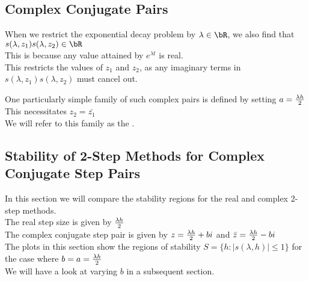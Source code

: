 \subsection{Complex Conjugate Pairs}
\begin{multicols}{2}
\columnbreak{}
\par When we restrict the exponential decay problem by $\lambda \in \bR$, we also find that $s(\lambda, z_1) s(\lambda, z_2) \in \bR$\\
This is because any value attained by $e^{\lambda t}$ is real.\\
This restricts the values of $z_1$ and $z_2$, as any imaginary terms in $s(\lambda, z_1) s(\lambda, z_2)$ must cancel out.\\

\par One particularly simple family of such complex pairs is defined by setting $a = \frac{\lambda h}{2}$\\
This necessitates $z_2 = \bar{z_1}$\\
We will refer to this family as the .\\
\end{multicols}

\subsection{Stability of 2-Step Methods for Complex Conjugate Step Pairs}
\par In this section we will compare the stability regions for the real and complex 2-step methods.\\
The real step size is given by $\frac{\lambda h}{2}$\\
The complex conjugate step pair is given by $z = \frac{\lambda h}{2} + bi$ and $\bar{z} = \frac{\lambda h}{2} - bi$\\
The plots in this section show the regions of stability $S = \{h : |s(\lambda, h)| \leq 1\}$ for the case where $b=a=\frac{\lambda h}{2}$\\
We will have a look at varying $b$ in a subsequent section.\\

